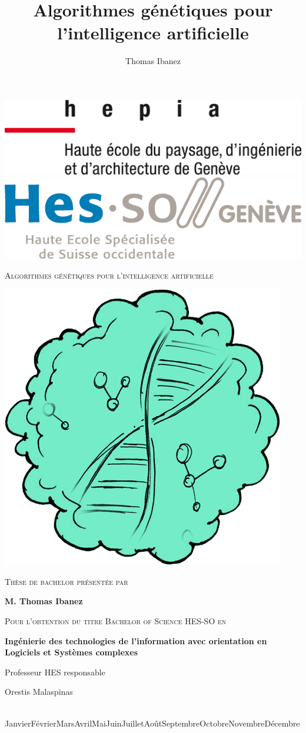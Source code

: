 \documentclass{article}
\title{Algorithmes génétiques pour l'intelligence artificielle}
\author{Thomas Ibanez}
\newcommand*{\printdate}{%
   \ifcase \month\or Janvier\or Février\or Mars\or Avril\or Mai\or Juin\or Juillet\or Août\or Septembre\or Octobre\or Novembre\or Décembre\fi \space \number\year}
\begin{document}
\begin{titlepage}
	\vspace*{-3cm}
		\includegraphics[width=.3\linewidth]{hepia.png}
		\hfill
		\includegraphics[width=.3\linewidth]{hes.png}\par
	\vspace{1cm}
	\centering
	{\scshape\huge Algorithmes génétiques pour l'intelligence artificielle \par}
	\vspace{1cm}
	\includegraphics[scale=0.4]{logo.png}\par
	\vspace{1.5cm}
	{\Large\scshape Thèse de bachelor présentée par\par}
	\vspace{0.5cm}
	{\bfseries\Large M. Thomas Ibanez\par}
	\vspace{0.8cm}
	{\scshape\Large Pour l'obtention du titre Bachelor of Science HES-SO en\par}
	\vspace{0.5cm}
	{\bfseries\Large Ingénierie des technologies de l'information avec orientation en Logiciels et Systèmes complexes\par}
	\vfill
	Professeur HES responsable\par
	\bfseries{Orestis Malaspinas\par}

	\vfill

	{\large\ \printdate \par}
\end{titlepage}
\end{document}
